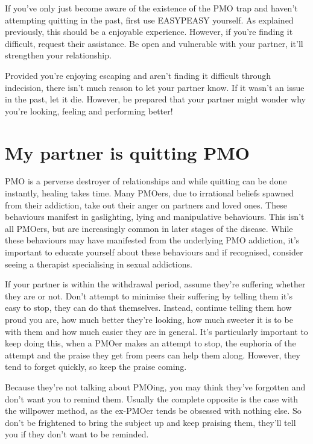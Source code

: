 \documentclass[easypeasy.tex]{subfiles}
\begin{document}
If you've only just become aware of the existence of the PMO trap and haven't attempting quitting in the past, first use EASYPEASY yourself. As explained previously, this should be a enjoyable experience. However, if you're finding it difficult, request their assistance. Be open and vulnerable with your partner, it'll strengthen your relationship. 

Provided you're enjoying escaping and aren't finding it difficult through indecision, there isn't much reason to let your partner know. If it wasn't an issue in the past, let it die. However, be prepared that your partner might wonder why you're looking, feeling and performing better!

\section{My partner is quitting PMO}

PMO is a perverse destroyer of relationships and while quitting can be done instantly, healing takes time. Many PMOers, due to irrational beliefs spawned from their addiction, take out their anger on partners and loved ones. These behaviours manifest in gaslighting, lying and manipulative behaviours. This isn't all PMOers, but are increasingly common in later stages of the disease. While these behaviours may have manifested from the underlying PMO addiction, it's important to educate yourself about these behaviours and if recognised, consider seeing a therapist specialising in sexual addictions.

If your partner is within the withdrawal period, assume they're suffering whether they are or not. Don't attempt to minimise their suffering by telling them it's easy to stop, they can do that themselves. Instead, continue telling them how proud you are, how much better they're looking, how much sweeter it is to be with them and how much easier they are in general. It's particularly important to keep doing this, when a PMOer makes an attempt to stop, the euphoria of the attempt and the praise they get from peers can help them along. However, they tend to forget quickly, so keep the praise coming.

Because they're not talking about PMOing, you may think they've forgotten and don't want you to remind them. Usually the complete opposite is the case with the willpower method, as the ex-PMOer tends be obsessed with nothing else. So don't be frightened to bring the subject up and keep praising them, they'll tell you if they don't want to be reminded.
\end{document}
